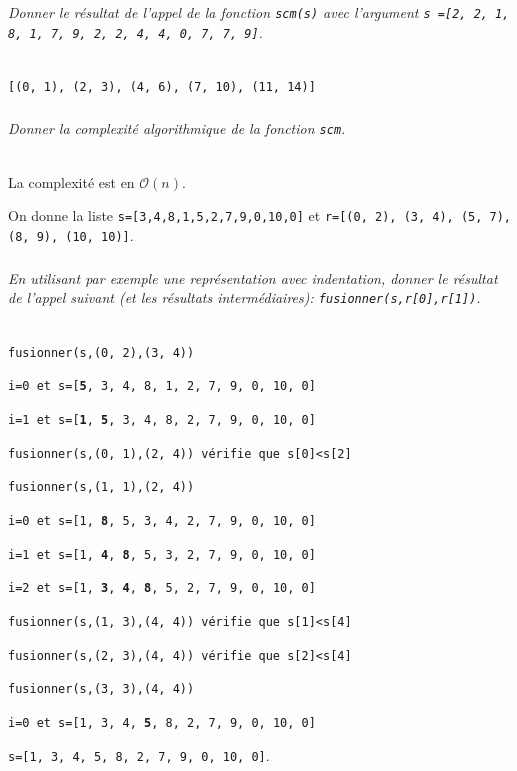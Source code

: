 \documentclass[10pt,fleqn]{article} %
\begin{document}
\subparagraph{}
\textit{Donner le résultat de l'appel de la fonction \texttt{scm(s)} avec l'argument \texttt{s =[2, 2, 1, 8, 1, 7, 9, 2, 2, 4, 4, 0, 7, 7, 9]}.}
\ifprof
\begin{corrige}~\\
\texttt{[(0, 1), (2, 3), (4, 6), (7, 10), (11, 14)]}
\end{corrige}
\else
\fi
\subparagraph{}
\textit{Donner la complexité algorithmique de la fonction \texttt{scm}.}
\ifprof
\begin{corrige}~\\
La complexité est en $\mathcal{O}(n)$.
\end{corrige}
\else
\fi
\ifprof
\else
\vspace{.5cm}
On donne la liste \texttt{s=[3,4,8,1,5,2,7,9,0,10,0]} et \texttt{r=[(0, 2), (3, 4), (5, 7), (8, 9), (10, 10)]}.
\fi
\subparagraph{}
\textit{En utilisant par exemple une représentation avec indentation, donner le résultat de l'appel suivant (et les résultats intermédiaires):  \texttt{fusionner(s,r[0],r[1])}.}
\ifprof
\begin{corrige}~\\

\noindent\texttt{fusionner(s,(0, 2),(3, 4))}

\hspace{.5cm}\texttt{i=0 et s=[\textbf{5}, 3, 4, 8, 1, 2, 7, 9, 0, 10, 0]}

\hspace{.5cm}\texttt{i=1 et s=[\textbf{1}, \textbf{5}, 3, 4, 8, 2, 7, 9, 0, 10, 0]}

\texttt{fusionner(s,(0, 1),(2, 4)) vérifie que s[0]<s[2]}

\texttt{fusionner(s,(1, 1),(2, 4))}

\hspace{.5cm}\texttt{i=0 et s=[1, \textbf{8}, 5, 3, 4, 2, 7, 9, 0, 10, 0]}

\hspace{.5cm}\texttt{i=1 et s=[1, \textbf{4}, \textbf{8}, 5, 3, 2, 7, 9, 0, 10, 0]}

\hspace{.5cm}\texttt{i=2 et s=[1, \textbf{3}, \textbf{4}, \textbf{8}, 5, 2, 7, 9, 0, 10, 0]}

\texttt{fusionner(s,(1, 3),(4, 4)) vérifie que s[1]<s[4]}

\texttt{fusionner(s,(2, 3),(4, 4)) vérifie que s[2]<s[4]}

\texttt{fusionner(s,(3, 3),(4, 4))}

\hspace{.5cm}\texttt{i=0 et s=[1, 3, 4, \textbf{5}, 8, 2, 7, 9, 0, 10, 0]}

\hspace{.5cm}\texttt{s=[1, 3, 4, 5, 8, 2, 7, 9, 0, 10, 0]}.
\end{corrige}
\else
\fi
\end{document}
